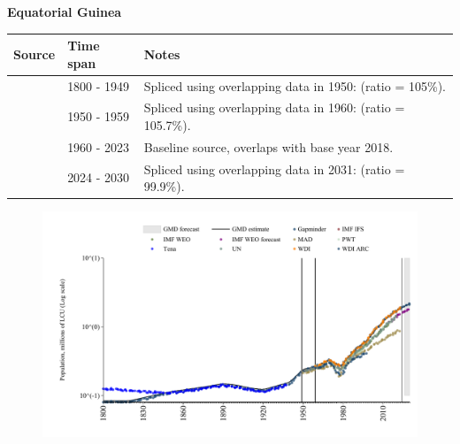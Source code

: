 \documentclass[12pt,a4paper,landscape]{article}
\begin{document}
\begin{adjustbox}{max totalsize={\paperwidth}{\paperheight},center}
\begin{minipage}[t][\textheight][t]{\textwidth}
\vspace*{0.5cm}
{}
\begin{center}
{\Large\bfseries Equatorial Guinea}
\end{center}
\vspace{0.5cm}
\begin{table}[H]
\centering
\small
\begin{tabular}{|l|l|l|}
\hline
\textbf{Source} & \textbf{Time span} & \textbf{Notes} \\
\hline
\rowcolor{white}\cite{Gapminder}& 1800 - 1949 &Spliced using overlapping data in 1950: (ratio = 105\%).\\
\rowcolor{lightgray}\cite{IMF_IFS}& 1950 - 1959 &Spliced using overlapping data in 1960: (ratio = 105.7\%).\\
\rowcolor{white}\cite{WDI}& 1960 - 2023 &Baseline source, overlaps with base year 2018.\\
\rowcolor{lightgray}\cite{Gapminder}& 2024 - 2030 &Spliced using overlapping data in 2031: (ratio = 99.9\%).\\
\hline
\end{tabular}
\end{table}
\begin{figure}[H]
\centering
\includegraphics[width=\textwidth,height=0.6\textheight,keepaspectratio]{graphs/GNQ_pop.pdf}
\end{figure}
\end{minipage}
\end{adjustbox}
\end{document}
